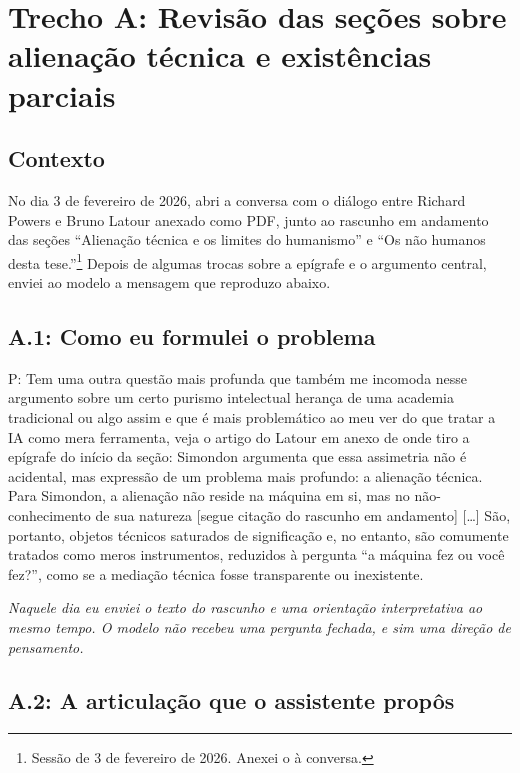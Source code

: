 \section*{Trecho A: Revisão das seções sobre alienação técnica e existências parciais}

\subsection*{Contexto}

No dia 3 de fevereiro de 2026, abri a conversa com o diálogo entre Richard Powers e Bruno Latour \parencite{Latour2008Powers} anexado como PDF, junto ao rascunho em andamento das seções ``Alienação técnica e os limites do humanismo'' e ``Os não humanos desta tese.''\footnote{Sessão de 3 de fevereiro de 2026. Anexei o \textcite{Latour2008Powers} à conversa.} Depois de algumas trocas sobre a epígrafe e o argumento central, enviei ao modelo a mensagem que reproduzo abaixo.

\subsection*{A.1: Como eu formulei o problema}

\begin{faladaP}
P: Tem uma outra questão mais profunda que também me incomoda nesse argumento sobre um certo purismo intelectual herança de uma academia tradicional ou algo assim e que é mais problemático ao meu ver do que tratar a IA como mera ferramenta, veja o artigo do Latour em anexo de onde tiro a epígrafe do início da seção: Simondon argumenta que essa assimetria não é acidental, mas expressão de um problema mais profundo: a alienação técnica. Para Simondon, a alienação não reside na máquina em si, mas no não-conhecimento de sua natureza {[}segue citação do rascunho em andamento{]} [\ldots] São, portanto, objetos técnicos saturados de significação e, no entanto, são comumente tratados como meros instrumentos, reduzidos à pergunta ``a máquina fez ou você fez?'', como se a mediação técnica fosse transparente ou inexistente.
\end{faladaP}

\noindent\emph{Naquele dia eu enviei o texto do rascunho e uma orientação interpretativa ao mesmo tempo. O modelo não recebeu uma pergunta fechada, e sim uma direção de pensamento.}

\bigskip

\subsection*{A.2: A articulação que o assistente propôs}

